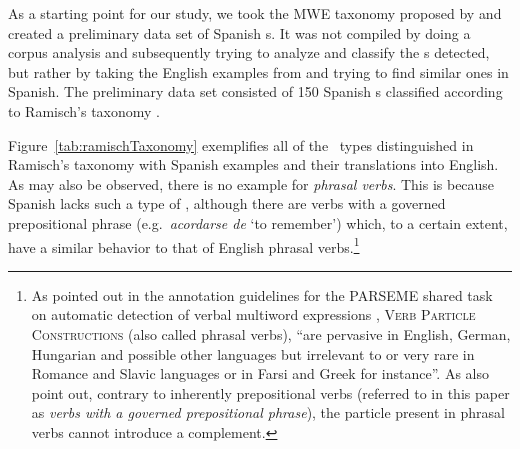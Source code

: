 \documentclass[output=paper]{langsci/langscibook}
\begin{document}
As a starting point for our study, we took the MWE taxonomy  proposed by \citet{Ramisch:2012,Ramisch:2015} and created a preliminary data set of Spanish \mwe s.
It was not compiled by doing a corpus analysis and subsequently trying to analyze and classify the \mwe s detected, but rather by taking the English examples from \citet{Ramisch:2012,Ramisch:2015} and trying to find similar ones in Spanish.
The preliminary data set consisted of 150 Spanish \mwe s classified according to Ramisch’s taxonomy \citep{Parra:2015}. 

Figure~\ref{tab:ramischTaxonomy}  
exemplifies all of the \mwe\ types distinguished in Ramisch's taxonomy with Spanish examples and their translations into English.
As may also be observed, there is no example for \textit{phrasal verbs}. 
This is because Spanish lacks such a type of \mwe, although there are verbs with a governed prepositional phrase (e.g.\ \textit{acordarse de} `to remember') which, to a certain extent, have a similar behavior to that of English phrasal verbs.\footnote{As pointed out in the annotation guidelines for the PARSEME shared task on automatic detection of verbal multiword expressions \citep{Vincze:2016}, \textsc{Verb Particle Constructions} (also called phrasal verbs), ``are pervasive in English, German, Hungarian and possible other languages but irrelevant to or very rare in Romance and Slavic languages or in Farsi and Greek for instance''. As \cite{Vincze:2016} also point out, contrary to inherently prepositional verbs (referred to in this paper as \textit{verbs with a governed prepositional phrase}), the particle present in phrasal verbs cannot introduce a complement.}
\end{document}
